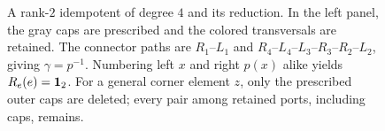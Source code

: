 \begin{figure}[htbp]
\caption{A rank-$2$ idempotent of degree $4$ and its reduction. In the
left panel, the gray caps are prescribed and the colored transversals
are retained. The connector paths are $R_1$--$L_1$ and
$R_4$--$L_4$--$L_3$--$R_3$--$R_2$--$L_2$, giving
$\gamma=p^{-1}$. Numbering left $x$ and right $p(x)$ alike yields
$R_e(e)=\mathbf 1_2$. For a general corner element $z$, only the prescribed
outer caps are deleted; every pair among retained ports, including
caps, remains.}
\label{fig:corner-reduction}
\end{figure}
